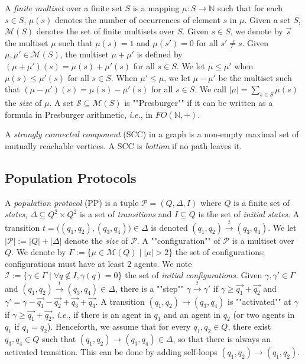 \documentclass[10pt,a4paper]{article}
\let\mathbb\mathds
\renewcommand{\geq}{\geqslant}
\renewcommand{\leq}{\leqslant}
\renewcommand{\ge}{\geqslant}
\newcommand{\nats}{\mathbb{N}}
\newcommand{\set}[1]{\{#1\}}
\newcommand{\deff}{:=}
\newcommand{\multisetsof}[1]{\mathcal{M}(#1)}
\newcommand{\ms}{\mu}
\newcommand{\size}[1]{|#1|}
\newcommand{\prot}{\mathcal{P}}
\newcommand{\config}{\gamma}
\newcommand{\configs}{\Gamma}
\newcommand{\transitions}{\Delta}
\newcommand*{\states}{Q}
\newcommand*{\atrans}{t}
\newcommand{\PP}{\mathcal{P}}                  %
\newcommand{\trans}[1]{\xrightarrow{#1}}       %
\newcommand{\initial}{\mathcal{I}}   %
\newcommand{\cSet}{\mathcal{S}}  %
\newcommand*{\ams}{\ms}
\begin{document}
%

A \emph{finite multiset} over a finite set \(S\) is a mapping \(\ams \colon S \rightarrow \nats\) such that for each \(s\in S\), \(\ams(s)\) denotes the number of occurrences of element \(s\) in \(\ams\).
Given a set \(S\), \(\multisetsof{S}\) denotes the set of finite multisets over \(S\).
Given \(s \in S\), we denote by \(\vec{s}\) the multiset \(\ams\) such that \(\ams(s) = 1\) and \(\ams(s') = 0\) for all \(s' \ne s\).
Given \(\ams, \ams' \in \multisetsof{S}\), the multiset \(\ams + \ams'\) is defined by \((\ams + \ams')(s) = \ams(s) + \ams'(s)\) for all \(s \in S\).
We let \(\ams \leq \ams'\) when \(\ams(s) \leq \ams'(s)\) for all \(s \in S\).
When \(\ams' \leq \ams\), we let \(\ams - \ams'\) be the multiset such that \((\ams- \ams')(s) = \ams(s) - \ams'(s)\) for all \(s \in S\).
%
%
We call \(|\ams| =\sum_{s\in S} \ams(s)\) the \emph{size} of \(\ams\).
%
%
A set \(\cSet \subseteq \multisetsof{S}\) is ""Presburger"" if it can be written as a formula in Presburger arithmetic, \emph{i.e.}, in \(FO(\nats,+)\).

A \emph{strongly connected component} (SCC) in a graph is a non-empty maximal set of mutually reachable vertices.
A SCC is \emph{bottom} if no path leaves it.

%
\subsection{Population Protocols}

%
A \emph{population protocol} (PP) is a tuple \(\PP=(Q,\transitions,I)\) where \(Q\) is a finite set of \emph{states}, \(\transitions \subseteq Q^2 \times Q^2\) is a set of \emph{transitions} and \(I \subseteq Q\) is the set of \emph{initial states}.
A transition \(\atrans=\big( (q_1, q_2), (q_3,q_4) \big) \in \transitions\) is denoted \((q_1, q_2)\trans{\atrans} (q_3, q_4)\).
We let \(\size{\prot} \deff \size{\states} + \size{\transitions}\) denote the \emph{size} of \(\prot\).
A ""configuration"" of \(\PP\) is a multiset over \(Q\).
We denote by \(\configs \deff \set{\ams \in \multisetsof{Q} \mid \size{\ams}>2}\) the set of configurations; configurations must have at least \(2\) agents.
We note \(\initial \deff \set{\config \in \configs \mid \forall q \notin I, \config(q) = 0}\) the set of \emph{initial configurations}.
Given \(\config,\config' \in \configs\) and \((q_1, q_2)\trans{\atrans} (q_3, q_4)\in \transitions\), there is a ""step"" \(\config \trans{t} \config'\) if \(\config \geq \vec{q_1} + \vec{q_2}\) and \(\config' = \config - \vec{q_1} - \vec{q_2} + \vec{q_3} + \vec{q_4}\).
A transition \((q_1, q_2)\trans{} (q_3, q_4)\) is ""activated"" at \(\config\) if \(\config \ge \vec{q_1}+\vec{q_2}\), \emph{i.e.}, if there is an agent in \(q_1\) and an agent in \(q_2\) (or two agents in \(q_1\) if \(q_1=q_2\)).
Henceforth, we assume that for every \(q_1,q_2 \in Q\), there exist \(q_3,q_4 \in Q\) such that \((q_1, q_2)\trans{} (q_3, q_4) \in \transitions\), so that there is always an activated transition.
This can be done by adding self-loops \((q_1, q_2)\trans{}(q_1, q_2)\).
%
\end{document}
